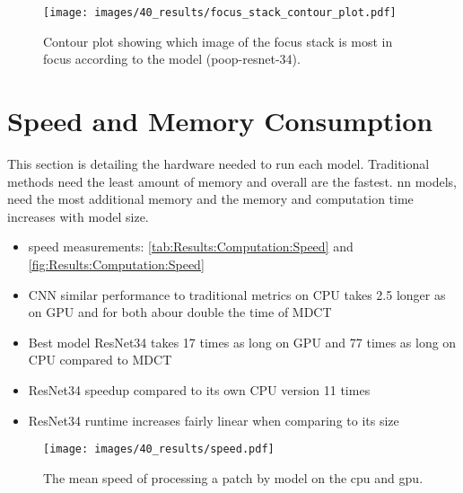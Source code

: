 \begin{figure}
    \centering
    \texttt{[image: images/40\_results/focus\_stack\_contour\_plot.pdf]}
    \caption{Contour plot showing which image of the focus stack is most in focus according to the model (\acs{poop}-\acs{resnet}-34).}
    \label{fig:Results:Stack:ContourPlot}
\end{figure}

\FloatBarrier

\section{Speed and Memory Consumption}
\label{sec:Results:Computation}

This section is detailing the hardware needed to run each model. Traditional methods need the least amount of memory and overall are the fastest. \Acl{nn} models, need the most additional memory and the memory and computation time increases with model size. 

\begin{itemize}
    \item speed measurements: \autoref{tab:Results:Computation:Speed} and \autoref{fig:Results:Computation:Speed}
    \item CNN similar performance to traditional metrics on CPU takes 2.5 longer as on GPU and for both abour double the time of MDCT
    \item Best model ResNet34 takes 17 times as long on GPU and 77 times as long on CPU compared to MDCT
    \item ResNet34 speedup compared to its own CPU version 11 times 
    \item ResNet34 runtime increases fairly linear when comparing to its size 
\end{itemize}


\begin{figure}
    \centering
    \texttt{[image: images/40\_results/speed.pdf]}
    \caption{The mean speed of processing a patch by model on the \ac{cpu} and \ac{gpu}.}
    \label{fig:Results:Computation:Speed}
\end{figure}


